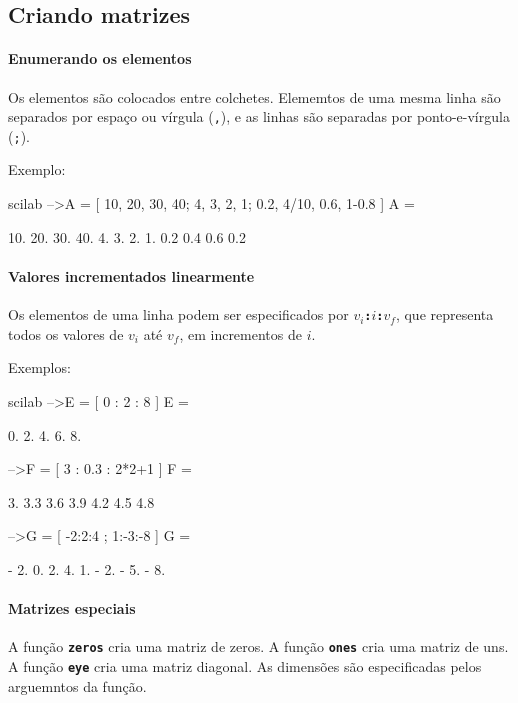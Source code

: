 \documentclass[11pt,fleqn]{practice}
\begin{document}
\subsection{Criando matrizes}

\paragraph{Enumerando os elementos}

Os elementos são colocados entre colchetes. Elememtos de uma mesma linha
são separados por espaço ou vírgula (\texttt{,}), e as linhas são
separadas por ponto-e-vírgula (\texttt{;}).

Exemplo:
\begin{lst}{scilab}
-->A = [ 10, 20, 30, 40; 4, 3, 2, 1; 0.2, 4/10, 0.6, 1-0.8 ]
 A  =
 
    10.    20.    30.    40.  
    4.     3.     2.     1.   
    0.2    0.4    0.6    0.2
\end{lst}

\paragraph{Valores incrementados linearmente}

Os elementos de uma linha podem ser especificados por
\textbf{\texttt{$v_i$:$i$:$v_f$}}, que representa todos os valores de
$v_i$ até $v_f$, em incrementos de $i$.

Exemplos:
\begin{lst}{scilab}
-->E = [ 0 : 2 : 8 ]
 E  =
 
    0.    2.    4.    6.    8.  
 
-->F = [ 3 : 0.3 : 2*2+1 ]
 F  =
 
    3.    3.3    3.6    3.9    4.2    4.5    4.8  
 
-->G = [ -2:2:4 ; 1:-3:-8 ]
 G  =
 
  - 2.    0.    2.    4.  
    1.  - 2.  - 5.  - 8.  
\end{lst}

\paragraph{Matrizes especiais}

A função \textbf{\texttt{zeros}} cria uma matriz de zeros. A função
\textbf{\texttt{ones}} cria uma matriz de uns. A função
\textbf{\texttt{eye}} cria uma matriz diagonal. As dimensões são
especificadas pelos arguemntos da função.
\end{document}
